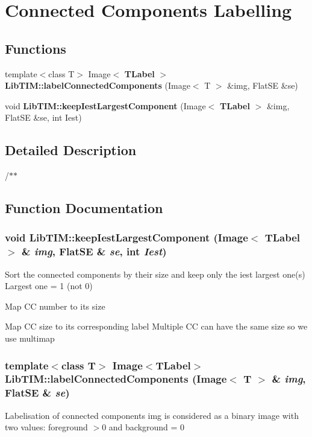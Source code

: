 \section{Connected Components Labelling}
\label{group__ccLabelling}
\subsection*{Functions}
\begin{CompactItemize}
\item 
template$<$class T$>$ Image$<$ {\bf TLabel} $>$ {\bf Lib\-TIM::label\-Connected\-Components} (Image$<$ T $>$ \&img, Flat\-SE \&se)
\item 
void {\bf Lib\-TIM::keep\-Iest\-Largest\-Component} (Image$<$ {\bf TLabel} $>$ \&img, Flat\-SE \&se, int Iest)
\end{CompactItemize}


\subsection{Detailed Description}
/$\ast$$\ast$

\subsection{Function Documentation}
\subsubsection{\setlength{\rightskip}{0pt plus 5cm}void Lib\-TIM::keep\-Iest\-Largest\-Component (Image$<$ {\bf TLabel} $>$ \& {\em img}, Flat\-SE \& {\em se}, int {\em Iest})\hspace{0.3cm}{\tt  [inline]}}\label{group__ccLabelling_ga1}


Sort the connected components by their size and keep only the iest largest one(s) Largest one = 1 (not 0)

Map CC number to its size

Map CC size to its corresponding label Multiple CC can have the same size so we use multimap 
\subsubsection{\setlength{\rightskip}{0pt plus 5cm}template$<$class T$>$ Image$<${\bf TLabel}$>$ Lib\-TIM::label\-Connected\-Components (Image$<$ T $>$ \& {\em img}, Flat\-SE \& {\em se})}\label{group__ccLabelling_ga0}


Labelisation of connected components img is considered as a binary image with two values: foreground $>$0 and background = 0 